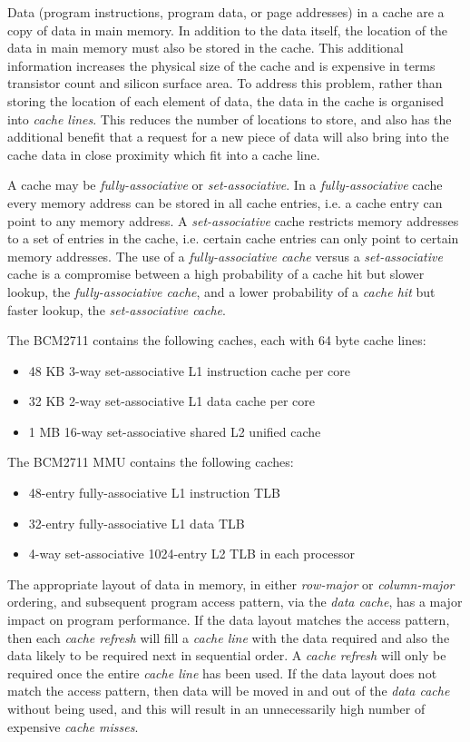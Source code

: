 Data (program instructions, program data, or page addresses) in a cache are a copy of data in main memory. In addition to the data itself, the location of the data in main memory must also be stored in the cache. This additional information increases the physical size of the cache and is expensive in terms transistor count and silicon surface area. To address this problem, rather than storing the location of each element of data, the data in the cache is organised into \emph{cache lines}. This reduces the number of locations to store, and also has the additional benefit that a request for a new piece of data will also bring into the cache data in close proximity which fit into a cache line.

A cache may be \emph{fully-associative} or \emph{set-associative}. In a \emph{fully-associative} cache every memory address can be stored in all cache entries, i.e. a cache entry can point to any memory address. A \emph{set-associative} cache restricts memory addresses to a set of entries in the cache, i.e. certain cache entries can only point to certain memory addresses. The use of a \emph{fully-associative cache} versus a \emph{set-associative} cache is a compromise between a high probability of a cache hit but slower lookup, the \emph{fully-associative cache}, and a lower probability of a \emph{cache hit} but faster lookup, the \emph{set-associative cache}.      

The BCM2711 contains the following caches, each with 64 byte cache lines:
\begin{itemize}
\item 48 KB 3-way set-associative L1 instruction cache per core
\item 32 KB 2-way set-associative L1 data cache per core
\item 1 MB 16-way set-associative shared L2 unified cache
\end{itemize}

The BCM2711 MMU contains the following caches:
\begin{itemize}
\item 48-entry fully-associative L1 instruction TLB
\item 32-entry fully-associative L1 data TLB
\item 4-way set-associative 1024-entry L2 TLB in each processor
\end{itemize}

The appropriate layout of data in memory, in either \emph{row-major} or \emph{column-major} ordering, and subsequent program access pattern, via the \emph{data cache}, has a major impact on program performance. If the data layout matches the access pattern, then each \emph{cache refresh} will fill a \emph{cache line} with the data required and also the data likely to be required next in sequential order. A \emph{cache refresh} will only be required once the entire \emph{cache line} has been used. If the data layout does not match the access pattern, then data will be moved in and out of the \emph{data cache} without being used, and this will result in an unnecessarily high number of expensive \emph{cache misses}. 


